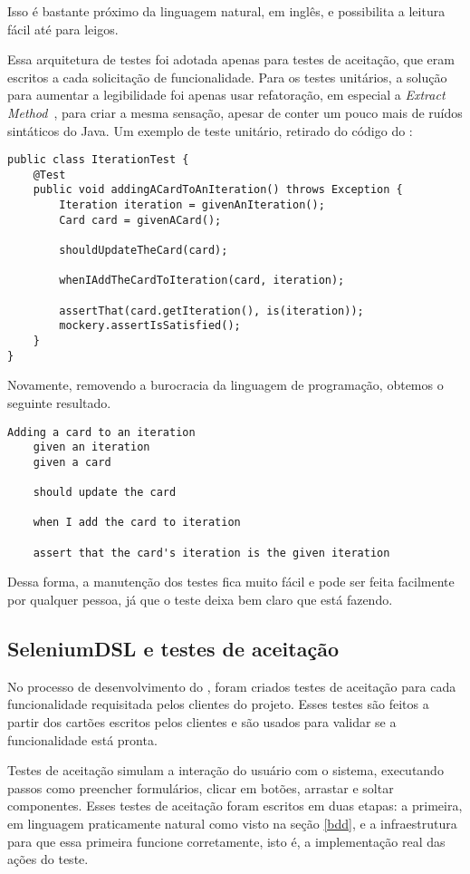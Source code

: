 Isso é bastante próximo da linguagem natural, em inglês, e possibilita a leitura fácil até para leigos.

Essa arquitetura de testes foi adotada apenas para testes de aceitação, que eram escritos a cada solicitação de funcionalidade. Para os testes unitários, a solução para aumentar a legibilidade foi  apenas usar refatoração, em especial a \textit{Extract Method}~\cite{refactoring}, para criar a mesma sensação, apesar de conter um pouco mais de ruídos sintáticos do Java. Um exemplo de teste unitário, retirado do código do \calopsita{}:

\begin{lstlisting}
public class IterationTest {
	@Test
	public void addingACardToAnIteration() throws Exception {
		Iteration iteration = givenAnIteration();
		Card card = givenACard();

		shouldUpdateTheCard(card);

		whenIAddTheCardToIteration(card, iteration);

		assertThat(card.getIteration(), is(iteration));
		mockery.assertIsSatisfied();
	}
}
\end{lstlisting}

Novamente, removendo a burocracia da linguagem de programação, obtemos o seguinte resultado.

\begin{verbatim}
Adding a card to an iteration
	given an iteration
	given a card

	should update the card

	when I add the card to iteration

	assert that the card's iteration is the given iteration
\end{verbatim}

Dessa forma, a manutenção dos testes fica muito fácil e pode ser feita facilmente por qualquer pessoa, já que o teste deixa bem claro que está fazendo.

\subsection{SeleniumDSL e testes de aceitação}

No processo de desenvolvimento do \calopsita{}, foram criados testes de aceitação para cada funcionalidade requisitada pelos clientes do projeto. Esses testes são feitos a partir dos cartões escritos pelos clientes e são usados para validar se a funcionalidade está pronta. 

Testes de aceitação simulam a interação do usuário com o sistema, executando passos como preencher formulários, clicar em botões, arrastar e soltar componentes. Esses testes de aceitação foram escritos em duas etapas: a primeira, em linguagem praticamente natural como visto na seção \ref{bdd}, e a infraestrutura para que essa primeira funcione corretamente, isto é, a implementação real das ações do teste.

